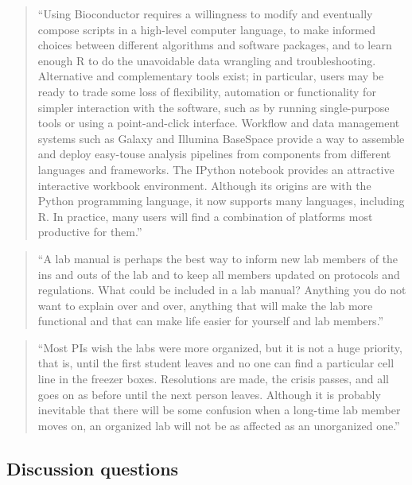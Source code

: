 \documentclass[]{tufte-book}
\begin{document}
\begin{quote}
``Using Bioconductor requires a willingness to modify and eventually compose
scripts in a high-level computer language, to make informed choices between
different algorithms and software packages, and to learn enough R to do the
unavoidable data wrangling and troubleshooting. Alternative and complementary
tools exist; in particular, users may be ready to trade some loss of
flexibility, automation or functionality for simpler interaction with the
software, such as by running single-purpose tools or using a point-and-click
interface. Workflow and data management systems such as Galaxy and Illumina
BaseSpace provide a way to assemble and deploy easy-touse analysis pipelines
from components from different languages and frameworks. The IPython notebook
provides an attractive interactive workbook environment. Although its origins
are with the Python programming language, it now supports many languages,
including R. In practice, many users will find a combination of platforms most
productive for them.'' \citep{huber2015orchestrating}
\end{quote}

\begin{quote}
``A lab manual is perhaps the best way to inform new lab members of the ins
and outs of the lab and to keep all members updated on protocols and
regulations. What could be included in a lab manual? Anything you do not
want to explain over and over, anything that will make the lab more
functional and that can make life easier for yourself and lab members.'' \citep{leips2010helm}
\end{quote}

\begin{quote}
``Most PIs wish the labs were more organized, but it is not a huge priority,
that is, until the first student leaves and no one can find a particular
cell line in the freezer boxes. Resolutions are made, the crisis passes,
and all goes on as before until the next person leaves. Although it is
probably inevitable that there will be some confusion when a long-time
lab member moves on, an organized lab will not be as affected as an unorganized
one.'' \citep{leips2010helm}
\end{quote}

\hypertarget{discussion-questions-6}{%
\subsection{Discussion questions}\label{discussion-questions-6}}
\end{document}
